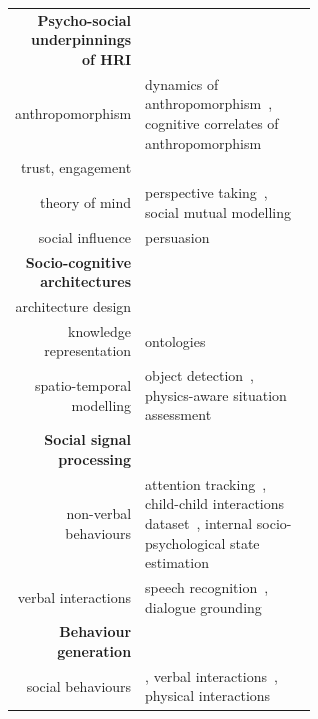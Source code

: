 \documentclass[11pt,a4paper]{report}
\begin{document}
\begin{table}[h]
    \centering
    \begin{tabular}{rp{0.6\linewidth}}
        \toprule
        \textbf{Psycho-social underpinnings of HRI} \\  
        anthropomorphism & \small dynamics of
        anthropomorphism~\cite{lemaignan2014dynamics}, \newline cognitive correlates of anthropomorphism~\cite{lemaignan2014cognitive} \\
        trust, engagement & \small \cite{flook2019impact,lemaignan2015youre,fink2014which} \\
        theory of mind & \small perspective taking~\cite{ros2010which, warnier2012when}, social mutual modelling~\cite{lemaignan2015mutual,dillenbourg2016symmetry} \\
        social influence & \small persuasion~\cite{winkle2019effective} \\
        \midrule
        \textbf{Socio-cognitive architectures} \\
        architecture design & \small \cite{lemaignan2017artificial, baxter2016cognitive,lemaignan2014challenges,lallee2012towards, mallet2010genom3} \\
        knowledge representation & \small
        ontologies~\cite{lemaignan2010oro, lemaignan2013explicit} \\    
        spatio-temporal modelling & \small object
        detection~\cite{wallbridge2017qualitative}, \newline physics-aware situation
        assessment~\cite{lemaignan2018underworlds,sallami2019simulation} \\
        \midrule
        \textbf{Social signal processing}\\
        non-verbal behaviours & \small attention
        tracking~\cite{lemaignan2016realtime}, child-child interactions
        dataset~\cite{lemaignan2018pinsoro}, \newline internal socio-psychological state estimation~\cite{bartlett2019what} \\
        verbal interactions & \small speech recognition~\cite{kennedy2017child}, dialogue grounding~\cite{lemaignan2011grounding} \\
        \midrule
        \textbf{Behaviour generation} \\
        social behaviours & \small \cite{lallee2011towards}, verbal interactions~\cite{wallbridge2019generating, wallbridge2019towards}, physical interactions~\cite{gharbi2013natural} \\

\end{tabular}
\end{table}
\end{document}
